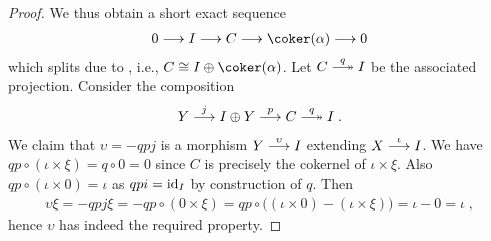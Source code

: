 \documentclass[a4paper,parskip=half,numbers=enddot, DIV=12]{scrreprt}
\begin{document}
\begin{proof}
	We thus obtain a short exact sequence
	\begin{align*}
		0\morphism I\morphism C\morphism\coker(\alpha)\morphism 0
	\end{align*}
	which splits due to , i.e., $C\cong I\oplus \coker(\alpha)$. Let $C\epimorphism[q] I$ be the associated projection. Consider the composition
	\begin{align*}
		Y\morphism[j] I\oplus Y\morphism[p] C\epimorphism[q] I\;.
	\end{align*}
	We claim that $\upsilon=-qpj$ is a morphism $Y\morphism[\upsilon] I$ extending $X\morphism[\iota]I$. We have $qp\circ(\iota\times\xi)=q\circ0=0$ since $C$ is precisely the cokernel of $\iota\times\xi$. Also $qp\circ (\iota\times0)=\iota$ as $qpi=\operatorname{id}_I$ by construction of $q$. Then 
	\begin{align*}
		\upsilon\xi=-qpj\xi=-qp\circ(0\times\xi)=qp\circ\big((\iota\times 0)-(\iota\times\xi)\big)=\iota-0=\iota\;,
	\end{align*}
	hence $\upsilon$ has indeed the required property.
\end{proof}
\end{document}
